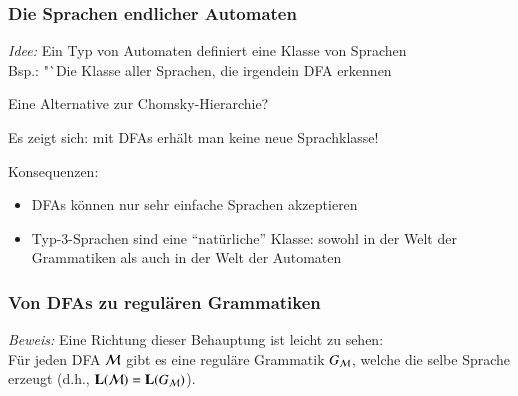 \documentclass[aspectratio=1610,onlymath]{beamer}
\begin{document}
\begin{frame}

\end{frame}

\begin{frame}\frametitle{Die Sprachen endlicher Automaten}

\emph{Idee:} Ein Typ von Automaten definiert eine Klasse von Sprachen\\
Bsp.: "`Die Klasse aller Sprachen, die irgendein DFA erkennen 
\bigskip

\alert{Eine Alternative zur Chomsky-Hierarchie?}
\smallskip\pause

Es zeigt sich: mit DFAs erhält man keine neue Sprachklasse!
\medskip


Konsequenzen:
\begin{itemize}
\item DFAs können nur sehr einfache Sprachen akzeptieren
\item Typ-3-Sprachen sind eine "`natürliche"' Klasse: sowohl in der Welt der Grammatiken als auch in der Welt der Automaten
\end{itemize}



\end{frame}

\begin{frame}\frametitle{Von DFAs zu regulären Grammatiken}


\emph{Beweis:} Eine Richtung dieser Behauptung ist leicht zu sehen:\\[0.5ex]
Für jeden DFA $\mathcal{M}$ gibt es eine reguläre Grammatik $G_{\mathcal{M}}$, welche die selbe Sprache erzeugt (d.h., $\textbf{\textcolor{black}{L}}(\mathcal{M})=\textbf{\textcolor{black}{L}}(G_{\mathcal{M}})$).\smallskip\pause


\end{frame}
\end{document}
